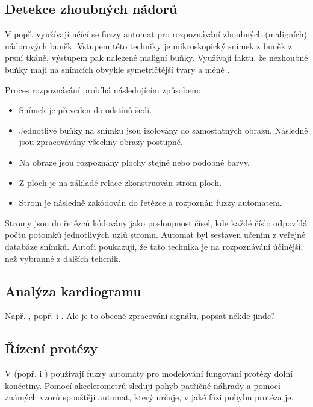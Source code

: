 \documentclass[a4paper,10pt]{article}
\begin{document}


\subsection{Detekce zhoubných nádorů}
V \cite{Est+-CytImAnaGenFuFiStMa} popř. \cite{Est+-CytImAnaGenFuFiStMa} využívají učící se fuzzy automat pro rozpoznávání zhoubných (maligních) nádorových buněk. Vstupem této techniky je mikroskopický snímek z buněk z prsní tkáně, výstupem pak nalezené maligní buňky. Využívají faktu, že nezhoubné buňky mají na snímcích obvykle symetričtější tvary a méně .

Proces rozpoznávání probíhá následujícím způsobem:
\begin{itemize}
 \item Snímek je převeden do odstínů šedi.
 \item Jednotlivé buňky na snímku jsou izolovány do samostatných obrazů. Následně jsou zpracovávány všechny obrazy postupně.
 \item Na obraze jsou rozpoznány plochy stejné nebo podobné barvy.
 \item Z ploch je na základě relace  zkonstruován strom ploch.
 \item Strom je následně zakódován do řetězce a rozpoznán fuzzy automatem.
\end{itemize}

Stromy jsou do řetězců kódovány jako posloupnost čísel, kde každé číslo odpovídá počtu potomků jednotlivých uzlů stromu. Automat byl sestaven učením z veřejné databáze snímků. Autoři poukazují, že tato technika je na rozpoznávání účinější, než vybranné z dalších tehcnik.


\subsection{Analýza kardiogramu}
Např. \cite{PedGac-LeaFuzzAut}, popř. i \cite{RigTza-FuzAutFauDia}. Ale je to obecně zpracování signálu, popsat někde jinde?

\subsection{Řízení protézy}
V \cite{Alv-HumGaiModUsGenFuzFinStaMac} (popř. i \cite{AlvTri-ComModQuaPerSig} )
používají fuzzy automaty pro modelování fungovaní protézy dolní končetiny. Pomocí akcelerometrů sledují pohyb patřičné náhrady a pomocí známých vzorů spouštějí automat, který určuje, v jaké fázi pohybu protéza je.
\end{document}
